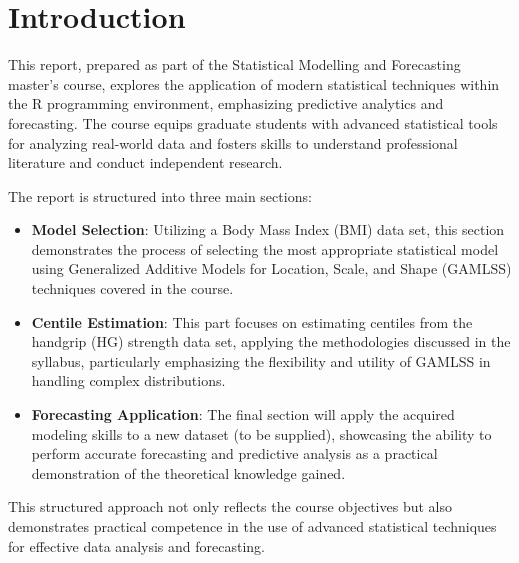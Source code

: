 \section{Introduction}

This report, prepared as part of the Statistical Modelling and Forecasting master's course,
explores the application of modern statistical techniques within the R programming environment,
emphasizing predictive analytics and forecasting. The course equips graduate students with
advanced statistical tools for analyzing real-world data
and fosters skills to understand professional literature and conduct independent research.

The report is structured into three main sections:
\begin{itemize}
\item \textbf{Model Selection}: Utilizing a Body Mass Index (BMI) data set, this section
  demonstrates the process of selecting the most appropriate statistical model using Generalized
  Additive Models for Location, Scale, and Shape (GAMLSS) techniques covered in the course.
\item \textbf{Centile Estimation}: This part focuses on estimating centiles from the handgrip (HG) strength data set,
  applying the methodologies discussed in the syllabus, particularly emphasizing the flexibility and
  utility of GAMLSS in handling complex distributions.
\item \textbf{Forecasting Application}: The final section will apply the acquired modeling skills to
  a new dataset (to be supplied), showcasing the ability to perform accurate forecasting and predictive
  analysis as a practical demonstration of the theoretical knowledge gained.
\end{itemize}

This structured approach not only reflects the course objectives but also demonstrates practical
competence in the use of advanced statistical techniques for effective data analysis and forecasting.
